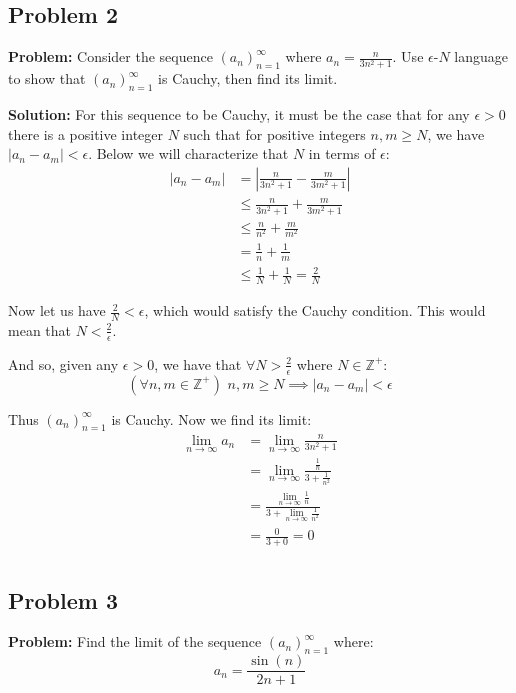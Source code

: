\documentclass{article}
\newcommand{\Z}{\mathbb Z}
\begin{document}
\subsection*{Problem 2}
\noindent\textbf{Problem:} Consider the sequence $(a_n)_{n=1}^\infty$ where $a_n=\frac{n}{3n^2+1}$. Use $\epsilon$-$N$ language to show that $(a_n)_{n=1}^\infty$ is Cauchy, then find its limit.
\bigskip

\noindent\textbf{Solution:} For this sequence to be Cauchy, it must be the case that for any $\epsilon>0$ there is a positive integer $N$ such that for positive integers $n,m\ge N$, we have $|a_n-a_m|<\epsilon$. Below we will characterize that $N$ in terms of $\epsilon$:
\begin{align*}
  |a_n-a_m|&=\left|\frac{n}{3n^2+1}-\frac{m}{3m^2+1}\right|\\
  &\le\frac{n}{3n^2+1}+\frac{m}{3m^2+1}\tag{triangle inequality}\\
  &\le\frac{n}{n^2}+\frac{m}{m^2}\tag{smaller denominator, larger value}\\
  &=\frac{1}{n}+\frac{1}{m}\\
  &\le\frac{1}{N}+\frac{1}{N}=\frac{2}{N}\tag{$n,m\ge N$}
\end{align*}

Now let us have $\frac{2}{N}<\epsilon$, which would satisfy the Cauchy condition. This would mean that $N<\frac{2}{\epsilon}$.

And so, given any $\epsilon>0$, we have that $\forall N>\frac{2}{\epsilon}$ where $N\in\Z^+$:
$$(\forall n,m\in\Z^+)\,\,n,m\ge N\implies |a_n-a_m|<\epsilon$$

Thus $(a_n)_{n=1}^\infty$ is Cauchy. Now we find its limit:
\begin{align*}
  \lim_{n\to\infty}a_n&=\lim_{n\to\infty}\frac{n}{3n^2+1}\tag{def. of $a_n$}\\
  &=\lim_{n\to\infty}\frac{\frac{1}{n}}{3+\frac{1}{n^2}}\\
  &=\frac{\lim_{n\to\infty}\frac{1}{n}}{3+\lim_{n\to\infty}\frac{1}{n^2}}\tag{limit of ratio is ratio of limits}\\
  &=\frac{0}{3+0}=0\\
\end{align*}

\subsection*{Problem 3}
\noindent\textbf{Problem:} Find the limit of the sequence $(a_n)_{n=1}^\infty$ where:
$$a_n=\frac{\sin(n)}{2n+1}$$
\end{document}
